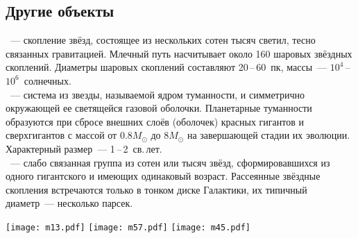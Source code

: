 \subsection{Другие объекты}
\begin{minipage}{0.63\tw}
    ~--- скопление звёзд, состоящее из нескольких сотен тысяч светил, тесно связанных гравитацией. Млечный путь насчитывает около 160 шаровых звёздных скоплений. Диаметры шаровых скоплений составляют 20\,--\,60~пк, массы~--- $10^4$\,--\,$10^6$~солнечных.\\

    ~--- система из звезды, называемой ядром туманности, и симметрично окружающей ее светящейся газовой оболочки. Планетарные туманности образуются при сбросе внешних слоёв (оболочек) красных гигантов и сверхгигантов с массой от $0.8M_\odot$ до $8M_\odot$ на завершающей стадии их эволюции. Характерный размер~--- 1\,--\,2~св.\,лет.\\

    ~--- слабо связанная группа из сотен или тысяч звёзд, сформировавшихся из одного гигантского  и имеющих одинаковый возраст. Рассеянные звёздные скопления встречаются только в тонком диске Галактики, их типичный диаметр~--- несколько парсек.
\end{minipage}
\hfill
\begin{minipage}{0.32\tw}
    \centering
    \vspace{-1.2pc}
    \texttt{[image: m13.pdf]}
    \vspace{1pc}
    \texttt{[image: m57.pdf]}
    \vspace{1.2pc}
    \texttt{[image: m45.pdf]}
\end{minipage}

